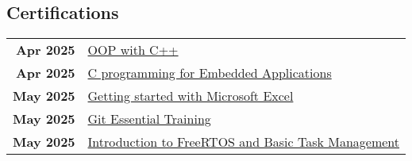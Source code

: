 \documentclass[lighthipster]{simplehipstercv}
\begin{document}
\begin{paracol}{2}
    \vspace{1em}

    \begin{minipage}[t]{0.35\textwidth}
        \section*{Certifications}
        \begin{tabular}{>{\footnotesize\bfseries}r | >{\footnotesize}p{}}
            Apr 2025 & \href{https://www.linkedin.com/learning/certificates/0d2436d703664eda7f28df73ca4216c3d028e37f4785ed9bd46fb9feb3981d10}{OOP with C++} \\
            Apr 2025 & \href{https://www.linkedin.com/learning/certificates/b9326f397277b66a58dfcfd4ea7e9d1ea10154daa7fb4b5c6698e5a81c0a3251}{C programming for Embedded Applications} \\
            May 2025 & \href{https://www.coursera.org/account/accomplishments/verify/6MX1VKYLQDJ7}{Getting started with Microsoft Excel} \\
            May 2025 & \href{https://www.linkedin.com/learning/certificates/d844a5ebadec3231609aad102789b3d830ffc5ab224192d38705e897becb9a0a}{Git Essential Training} \\
            May 2025 & \href{https://www.linkedin.com/learning/certificates/b57bac21a5b840d35eef55d8416340d7978d2904e7969aed7dd1bc2083511b77}{Introduction to FreeRTOS and Basic Task Management} \\
        \end{tabular}
        
        \bigskip
    \end{minipage}
    \hfill
    \begin{minipage}[t]{0.3\textwidth}

\end{minipage}
\end{paracol}
\end{document}
